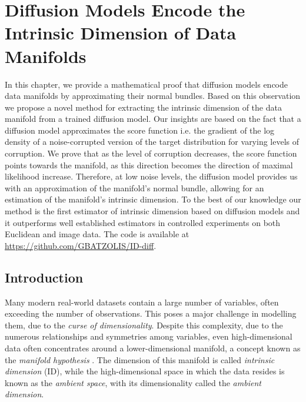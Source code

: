 \chapter{Diffusion Models Encode the Intrinsic Dimension of Data Manifolds}\label{Chapter:intrinsic-dimension}

\ifpdf
    \graphicspath{{Chapter3/Figs/Raster/}{Chapter3/Figs/PDF/}{Chapter3/Figs/}}
\else
    \graphicspath{{Chapter3/Figs/Vector/}{Chapter3/Figs/}}
\fi

In this chapter, we provide a mathematical proof that diffusion models encode data manifolds by approximating their normal bundles. Based on this observation we propose a novel method for extracting the intrinsic dimension of the data manifold from a trained diffusion model. Our insights are based  on the fact that a diffusion model approximates the score function i.e. the gradient of the log density of a noise-corrupted version of the target distribution for varying levels of corruption. We prove that as the level of corruption decreases, the score function points towards the manifold, as this direction becomes the direction of maximal likelihood increase. Therefore, at low noise levels, the diffusion model provides us with an approximation of the manifold's normal bundle, allowing for an estimation of the manifold's intrinsic dimension.  To the best of our knowledge our method is the first estimator of intrinsic dimension based on diffusion models and it outperforms well established estimators in controlled experiments on both Euclidean and image data. The code is available at \url{https://github.com/GBATZOLIS/ID-diff}.

\section{Introduction}\label{ch3:sec:introduction}

Many modern real-world datasets contain a large number of variables, often exceeding the number of observations. This poses a major challenge in modelling them, due to the \textit{curse of dimensionality}. Despite this complexity,  due to the numerous relationships and symmetries among variables, even high-dimensional data often concentrates around a lower-dimensional manifold, a concept known as the \textit{manifold hypothesis} 
\cite{manifold_hypothesis}. The dimension of this manifold is called \textit{intrinsic dimension} (ID),  while the high-dimensional space in which the data resides is known as the
\textit{ambient space}, with its dimensionality called the \textit{ambient dimension}.

